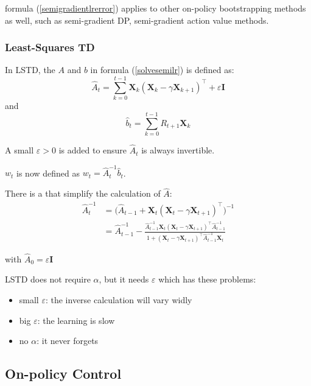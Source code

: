 formula (\ref{semigradientlrerror}) applies to other on-policy bootstrapping methods as well, such as semi-gradient DP, semi-gradient action value methods.

\subsubsection{Least-Squares TD}

In LSTD, the $A$ and $b$ in formula (\ref{solvesemilr}) is defined as:
\begin{equation}
	\widehat{A}_t = \sum_{k=0}^{t-1} \mathbf{X}_k (\mathbf{X}_k - \gamma \mathbf{X}_{k+1} )^\top + \varepsilon \mathbf{I}
\end{equation}
and
\begin{equation}
	\widehat{b}_t=\sum_{k=0}^{t-1}R_{t+1}\mathbf{X}_k
\end{equation}

A small $\varepsilon > 0$ is added to ensure $\widehat{A}_t$ is always invertible. 

$w_t$ is now defined as $w_t=\widehat{A}_t^{-1} \widehat{b}_t$.

There is a  that simplify the calculation of $\widehat{A}$:
\begin{equation}
	\begin{aligned}
		\widehat{A}_t^{-1} &= \Big (\widehat{A}_{t-1} + \mathbf{X}_t (\mathbf{X}_t - \gamma \mathbf{X}_{t+1})^\top \Big)^{-1}\\
		&= \widehat{A}_{t-1}^{-1} - \frac{\widehat{A}_{t-1}^{-1} \mathbf{X}_t (\mathbf{X}_t - \gamma \mathbf{X}_{t+1})^\top \widehat{A}_{t-1}^{-1} }{1 + (\mathbf{X}_t - \gamma \mathbf{X}_{t+1})^\top \widehat{A}_{t-1}^{-1} \mathbf{X}_t }
	\end{aligned}
\end{equation}

with $\widehat{A}_0 = \varepsilon \mathbf{I}$

LSTD does not require $\alpha$, but it needs $\varepsilon$ which has these problems: 
\begin{itemize}
	\item small $\varepsilon$: the inverse calculation will vary widly
	\item big $\varepsilon$: the learning is slow
	\item no $\alpha$: it never forgets
\end{itemize}

\subsection{On-policy Control}

